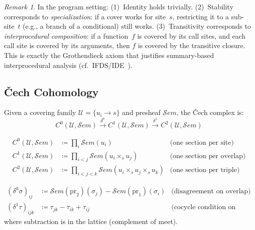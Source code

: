 \documentclass[acmsmall,screen]{acmart}
\theoremstyle{remark}
\newtheorem{remark}{Remark}
\newcommand{\Sem}{\mathcal{S}\mathit{em}}
\newcommand{\defeq}{\coloneqq}
\begin{document}
\begin{remark}
In the program setting: (1)~Identity holds trivially.
(2)~Stability corresponds to \emph{specialization}: if a cover works
for site~$s$, restricting it to a sub-site~$t$ (e.g., a branch of a
conditional) still works.
(3)~Transitivity corresponds to \emph{interprocedural composition}:
if a function~$f$ is covered by its call sites, and each call site is
covered by its arguments, then $f$ is covered by the transitive closure.
This is exactly the Grothendieck axiom that justifies summary-based
interprocedural analysis (cf.\ IFDS/IDE~\cite{RepsHorwitzSagiv95}).
\end{remark}

\subsection{\v{C}ech Cohomology}\label{sec:cech}

Given a covering family $\mathcal{U} = \{ u_i \to s \}$ and presheaf
$\Sem$, the \v{C}ech complex is:
\[
  C^0(\mathcal{U}, \Sem) \xrightarrow{\delta^0}
  C^1(\mathcal{U}, \Sem) \xrightarrow{\delta^1}
  C^2(\mathcal{U}, \Sem)
\]

\begin{definition}\label{def:cech-cochains}
\begin{align*}
  C^0(\mathcal{U}, \Sem) &\defeq \prod_{i} \Sem(u_i)
    & \text{(one section per site)} \\
  C^1(\mathcal{U}, \Sem) &\defeq \prod_{i < j} \Sem(u_i \times_s u_j)
    & \text{(one section per overlap)} \\
  C^2(\mathcal{U}, \Sem) &\defeq \prod_{i < j < k}
    \Sem(u_i \times_s u_j \times_s u_k)
    & \text{(one section per triple)}
\end{align*}
\end{definition}

\begin{definition}\label{def:coboundary}
\begin{align*}
  (\delta^0 \sigma)_{ij} &\defeq
    \Sem(\mathrm{pr}_2)(\sigma_j) - \Sem(\mathrm{pr}_1)(\sigma_i)
    & \text{(disagreement on overlap)} \\
  (\delta^1 \tau)_{ijk} &\defeq
    \tau_{jk} - \tau_{ik} + \tau_{ij}
    & \text{(cocycle condition on triples)}
\end{align*}
where subtraction is in the lattice (complement of meet).
\end{definition}
\end{document}
